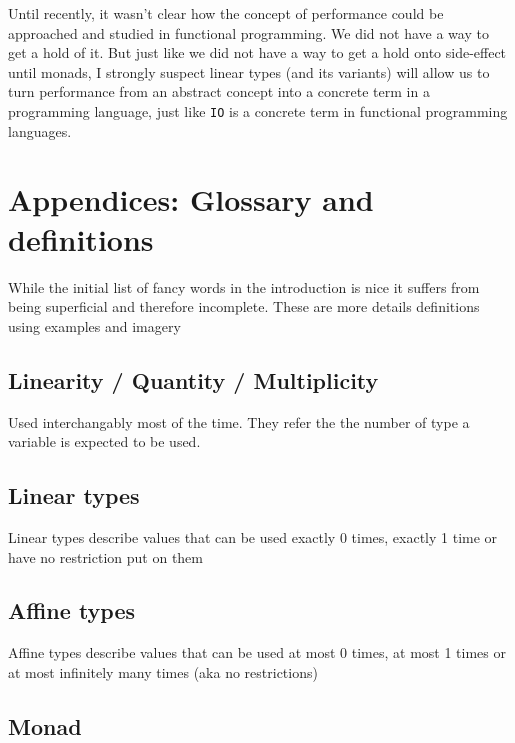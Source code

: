 \documentclass[
]{article}
\begin{document}
Until recently, it wasn't clear how the concept of performance could be
approached and studied in functional programming. We did not have a way
to get a hold of it. But just like we did not have a way to get a hold
onto side-effect until monads, I strongly suspect linear types (and its
variants) will allow us to turn performance from an abstract concept
into a concrete term in a programming language, just like \texttt{IO} is
a concrete term in functional programming languages.

\newpage

\hypertarget{appendices-glossary-and-definitions}{%
\section{Appendices: Glossary and
definitions}\label{appendices-glossary-and-definitions}}

While the initial list of fancy words in the introduction is nice it
suffers from being superficial and therefore incomplete. These are more
details definitions using examples and imagery

\hypertarget{linearity-quantity-multiplicity-1}{%
\subsection{Linearity / Quantity /
Multiplicity}\label{linearity-quantity-multiplicity-1}}

Used interchangably most of the time. They refer the the number of type
a variable is expected to be used.

\hypertarget{linear-types-1}{%
\subsection{Linear types}\label{linear-types-1}}

Linear types describe values that can be used exactly 0 times, exactly 1
time or have no restriction put on them

\hypertarget{affine-types}{%
\subsection{Affine types}\label{affine-types}}

Affine types describe values that can be used at most 0 times, at most 1
times or at most infinitely many times (aka no restrictions)

\hypertarget{monad}{%
\subsection{Monad}\label{monad}}
\end{document}
